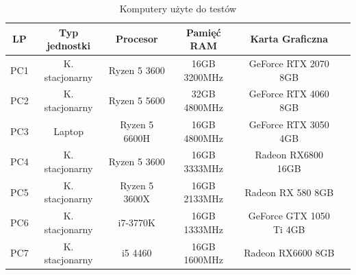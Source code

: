 \documentclass[12pt,twoside]{article}
\begin{document}
\begin{table}[ht]
    \caption{Komputery użyte do testów}
    \centering		
        \begin{tabular}{|c|c|c|c|c|c|}	
            \hline
            LP & Typ jednostki & Procesor & Pamięć RAM & Karta Graficzna  \\
            \hline
            PC1 & K. stacjonarny & Ryzen 5 3600 & 16GB 3200MHz & GeForce RTX 2070 8GB\\
            \hline
            PC2 & K. stacjonarny & Ryzen 5 5600 & 32GB 4800MHz & GeForce RTX 4060 8GB  \\
            \hline
            PC3 & Laptop & Ryzen 5 6600H & 16GB 4800MHz & GeForce RTX 3050 4GB  \\
            \hline
            PC4 & K. stacjonarny & Ryzen 5 3600 & 16GB 3333MHz & Radeon RX6800 16GB \\
            \hline
            PC5 & K. stacjonarny & Ryzen 5 3600X & 16GB 2133MHz & Radeon RX 580 8GB\\
            \hline
            PC6 & K. stacjonarny & i7-3770K & 16GB 1333MHz & GeForce GTX 1050 Ti 4GB \\
            \hline
            PC7 & K. stacjonarny & i5 4460 & 16GB 1600MHz & Radeon RX6600 8GB \\
            \hline

        \end{tabular}	
    \label{Tabela:KomputeryTesty}
\end{table}	
\end{document}
